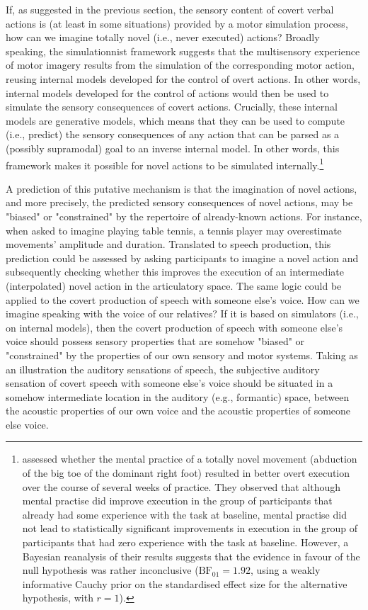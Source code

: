 \documentclass[utf8]{template/frontiersSCNS} %
\begin{document}
If, as suggested in the previous section, the sensory content of covert verbal actions is (at least in some situations) provided by a motor simulation process, how can we imagine totally novel (i.e., never executed) actions? Broadly speaking, the simulationnist framework suggests that the multisensory experience of motor imagery results from the simulation of the corresponding motor action, reusing internal models developed for the control of overt actions. In other words, internal models developed for the control of actions would then be used to simulate the sensory consequences of covert actions. Crucially, these internal models are generative models, which means that they can be used to compute (i.e., predict) the sensory consequences of any action that can be parsed as a (possibly supramodal) goal to an inverse internal model. In other words, this framework makes it possible for novel actions to be simulated internally.\footnote{\cite{mulder_role_2004} assessed whether the mental practice of a totally novel movement (abduction of the big toe of the dominant right foot) resulted in better overt execution over the course of several weeks of practice. They observed that although mental practise did improve execution in the group of participants that already had some experience with the task at baseline, mental practise did not lead to statistically significant improvements in execution in the group of participants that had zero experience with the task at baseline. However, a Bayesian reanalysis of their results suggests that the evidence in favour of the null hypothesis was rather inconclusive ($\text{BF}_{01} = 1.92$, using a weakly informative Cauchy prior on the standardised effect size for the alternative hypothesis, with $r = 1$).}

A prediction of this putative mechanism is that the imagination of novel actions, and more precisely, the predicted sensory consequences of novel actions, may be "biased" or "constrained" by the repertoire of already-known actions. For instance, when asked to imagine playing table tennis, a tennis player may overestimate movements' amplitude and duration. Translated to speech production, this prediction could be assessed by asking participants to imagine a novel action and subsequently checking whether this improves the execution of an intermediate (interpolated) novel action in the articulatory space. The same logic could be applied to the covert production of speech with someone else's voice. How can we imagine speaking with the voice of our relatives? If it is based on simulators (i.e., on internal models), then the covert production of speech with someone else's voice should possess sensory properties that are somehow "biased" or "constrained" by the properties of our own sensory and motor systems. Taking as an illustration the auditory sensations of speech, the subjective auditory sensation of covert speech with someone else's voice should be situated in a somehow intermediate location in the auditory (e.g., formantic) space, between the acoustic properties of our own voice and the acoustic properties of someone else voice.
\end{document}
